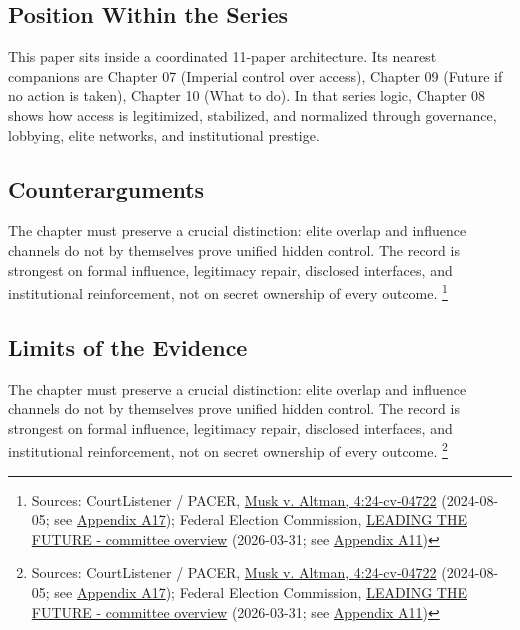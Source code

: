 \documentclass[
  american,
  11pt,
  letterpaper,
]{article}
\begin{document}
\subsection{Position Within the
Series}\label{position-within-the-series-8}

This paper sits inside a coordinated 11-paper architecture. Its nearest
companions are Chapter 07 (Imperial control over access), Chapter 09
(Future if no action is taken), Chapter 10 (What to do). In that series
logic, Chapter 08 shows how access is legitimized, stabilized, and
normalized through governance, lobbying, elite networks, and
institutional prestige.

\subsection{Counterarguments}\label{counterarguments-8}

The chapter must preserve a crucial distinction: elite overlap and
influence channels do not by themselves prove unified hidden control.
The record is strongest on formal influence, legitimacy repair,
disclosed interfaces, and institutional reinforcement, not on secret
ownership of every outcome. \footnote{Sources: CourtListener / PACER,
  \href{https://www.courtlistener.com/docket/69013420/musk-v-altman/}{Musk
  v. Altman, 4:24-cv-04722} (2024-08-05; see
  \hyperref[ch-08-appendix-a17-musk-v-altman-4-24-cv-04722]{Appendix
  A17}); Federal Election Commission,
  \href{https://www.fec.gov/data/committee/C00916114/}{LEADING THE
  FUTURE - committee overview} (2026-03-31; see
  \hyperref[ch-08-appendix-a11-leading-the-future-committee-overview]{Appendix
  A11})}

\subsection{Limits of the Evidence}\label{limits-of-the-evidence-8}

The chapter must preserve a crucial distinction: elite overlap and
influence channels do not by themselves prove unified hidden control.
The record is strongest on formal influence, legitimacy repair,
disclosed interfaces, and institutional reinforcement, not on secret
ownership of every outcome. \footnote{Sources: CourtListener / PACER,
  \href{https://www.courtlistener.com/docket/69013420/musk-v-altman/}{Musk
  v. Altman, 4:24-cv-04722} (2024-08-05; see
  \hyperref[ch-08-appendix-a17-musk-v-altman-4-24-cv-04722]{Appendix
  A17}); Federal Election Commission,
  \href{https://www.fec.gov/data/committee/C00916114/}{LEADING THE
  FUTURE - committee overview} (2026-03-31; see
  \hyperref[ch-08-appendix-a11-leading-the-future-committee-overview]{Appendix
  A11})}
\end{document}
